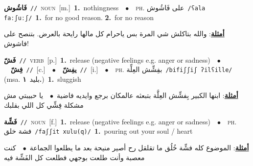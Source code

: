 \documentclass[10pt,a4paper,twoside]{article} %
\begin{document}
\begin{multicols}{2}
{\setlength\topsep{0pt}\textbf{\foreignlanguage{arabic}{فَاشُوش}}\ {\color{gray}\texttt{//}\color{black}}\ \textsc{noun}\ [m.]\ \textbf{1.}~nothingness\ \ $\bullet$\ \ \textsc{ph.} \color{gray} \foreignlanguage{arabic}{على فَاشُوش}\color{black}\ {\color{gray}\texttt{/{\sffamily ʕala faːʃuːʃ}/}\color{black}}\ \textbf{1.}~for no good reason.  \textbf{2.}~for no reason\  \begin{flushright}\color{gray}\foreignlanguage{arabic}{\textbf{\underline{\foreignlanguage{arabic}{أمثلة}}}: والله بتاكلش شي المرة بس ياحرام كل مالها رايحة بالعرض. بتنصح على فاشوش!}\end{flushright}\color{black}} \vspace{2mm}

{\setlength\topsep{0pt}\textbf{\foreignlanguage{arabic}{فَشّ}}\ {\color{gray}\texttt{//}\color{black}}\ \textsc{verb}\ [p.]\ \textbf{1.}~release (negative feelings e.g. anger or sadness)\ \ $\bullet$\ \ \setlength\topsep{0pt}\textbf{\foreignlanguage{arabic}{فِشّ}}\ {\color{gray}\texttt{//}\color{black}}\ [c.]\ \ $\bullet$\ \ \setlength\topsep{0pt}\textbf{\foreignlanguage{arabic}{يفِشّ}}\ {\color{gray}\texttt{//}\color{black}}\ [i.]\ \ $\bullet$\ \ \textsc{ph.} \color{gray} \foreignlanguage{arabic}{بفِشِّش العِلِّة}\color{black}\ {\color{gray}\texttt{/{\sffamily bifiʃʃiʃ ʔilʕille}/}\color{black}}\ \color{gray} (msa. \foreignlanguage{arabic}{بليد}~\foreignlanguage{arabic}{\textbf{١.}})\color{black}\ \textbf{1.}~sluggish\  \begin{flushright}\color{gray}\foreignlanguage{arabic}{\textbf{\underline{\foreignlanguage{arabic}{أمثلة}}}: ابنها الكبير بِفشِّش العِلَّة  بتبعثه عالمكان برجع وايديه فاضية\ $\bullet$\ \  يا حبيبتي مش مشكلة فِشِّي كل اللي بقلبك}\end{flushright}\color{black}} \vspace{2mm}

{\setlength\topsep{0pt}\textbf{\foreignlanguage{arabic}{فَشِّة}}\ {\color{gray}\texttt{//}\color{black}}\ \textsc{noun}\ [f.]\ \textbf{1.}~release (negative feelings e.g. anger or sadness)\ \ $\bullet$\ \ \textsc{ph.} \color{gray} \foreignlanguage{arabic}{فشة خلق}\color{black}\ {\color{gray}\texttt{/{\sffamily faʃʃit xulu(q)}/}\color{black}}\ \textbf{1.}~pouring out your soul / heart\  \begin{flushright}\color{gray}\foreignlanguage{arabic}{\textbf{\underline{\foreignlanguage{arabic}{أمثلة}}}: الموضوع كله فشِّة خُلُق ما تقلقل رح أصير منيحة بعد ما يطلعوا الجماعة\ $\bullet$\ \  كنت معصبة وأنت طلعت بوجهي فطلعت كل الفَشِّة فيه}\end{flushright}\color{black}} \vspace{2mm}


\end{multicols}
\end{document}

